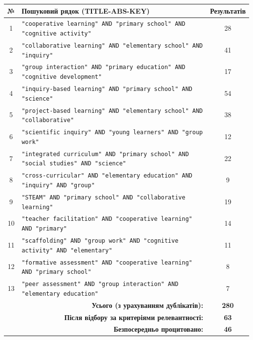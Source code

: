 \documentclass[a4paper,14pt]{extarticle}
\begin{document}
\begin{center}
\label{tab:A.1}
\begin{longtable}{|c|>{\raggedright\arraybackslash}p{8cm}|c|}
\hline
\textbf{№} & \textbf{Пошуковий рядок (TITLE-ABS-KEY)} & \textbf{Результатів} \\
\hline
1 & \texttt{"cooperative learning" AND "primary school" AND "cognitive activity"} & 28 \\
\hline
2 & \texttt{"collaborative learning" AND "elementary school" AND "inquiry"} & 41 \\
\hline
3 & \texttt{"group interaction" AND "primary education" AND "cognitive development"} & 17 \\
\hline
4 & \texttt{"inquiry-based learning" AND "primary school" AND "science"} & 54 \\
\hline
5 & \texttt{"project-based learning" AND "elementary school" AND "collaborative"} & 38 \\
\hline
6 & \texttt{"scientific inquiry" AND "young learners" AND "group work"} & 12 \\
\hline
7 & \texttt{"integrated curriculum" AND "primary school" AND "social studies" AND "science"} & 22 \\
\hline
8 & \texttt{"cross-curricular" AND "elementary education" AND "inquiry" AND "group"} & 9 \\
\hline
9 & \texttt{"STEAM" AND "primary school" AND "collaborative learning"} & 19 \\
\hline
10 & \texttt{"teacher facilitation" AND "cooperative learning" AND "primary"} & 14 \\
\hline
11 & \texttt{"scaffolding" AND "group work" AND "cognitive activity" AND "elementary"} & 11 \\
\hline
12 & \texttt{"formative assessment" AND "cooperative learning" AND "primary school"} & 8 \\
\hline
13 & \texttt{"peer assessment" AND "group interaction" AND "elementary education"} & 7 \\
\hline
\multicolumn{2}{|r|}{\textbf{Усього (з урахуванням дублікатів):}} & \textbf{280} \\
\hline
\multicolumn{2}{|r|}{\textbf{Після відбору за критеріями релевантності:}} & \textbf{63} \\
\hline
\multicolumn{2}{|r|}{\textbf{Безпосередньо процитовано:}} & \textbf{46} \\
\hline
\end{longtable}
\end{center}
\end{document}
